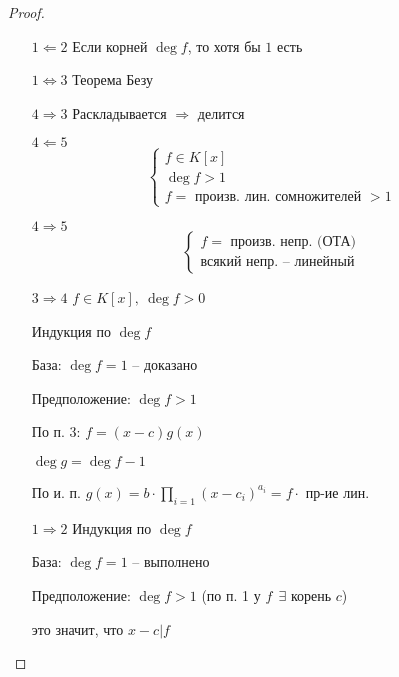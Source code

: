     \begin{proof}
        $ $
        \begin{enumerate} %
            \item[$1 \Leftarrow 2$] Если корней $\deg f$, то хотя бы $1$ есть
            \item[$1 \Leftrightarrow 3$] Теорема Безу
            \item[$4 \Rightarrow 3$] Раскладывается $\Rightarrow$ делится
            \item[$4 \Leftarrow 5$]
                \[
                    \begin{cases}
                        f \in K[x] \\
                        \deg f > 1 \\
                        f = \text{ произв. лин. сомножителей } > 1
                    \end{cases}    
                \]
            \item[$4 \Rightarrow 5$]
                \[
                    \begin{cases}
                        f = \text{ произв. непр. (ОТА)} \\
                        \text{всякий непр. -- линейный}
                    \end{cases}    
                \]
            \item[$3 \Rightarrow 4$] $f \in K[x], \ \deg f > 0$
                \par \quad Индукция по $\deg f$
                \par \quad \quad База: $\deg f = 1$ -- доказано
                \par \quad \quad Предположение: $\deg f > 1$
                \par \quad \quad \quad По п. 3: $f = (x - c) g(x)$
                \par \quad \quad \quad $\deg g = \deg f - 1$
                \par \quad \quad \quad По и. п. $g(x) = b \cdot \prod_{i=1} (x - c_i)^{a_i} = f \cdot \text{ пр-ие лин.}$
            \item[$1 \Rightarrow 2$] Индукция по $\deg f$
                \par \quad База: $\deg f = 1$ -- выполнено
                \par \quad Предположение: $\deg f > 1$ (по п. 1 у $f \ \ \exists$ корень $c$)
                \par это значит, что $x - c | f$

\end{enumerate}
\end{proof}
